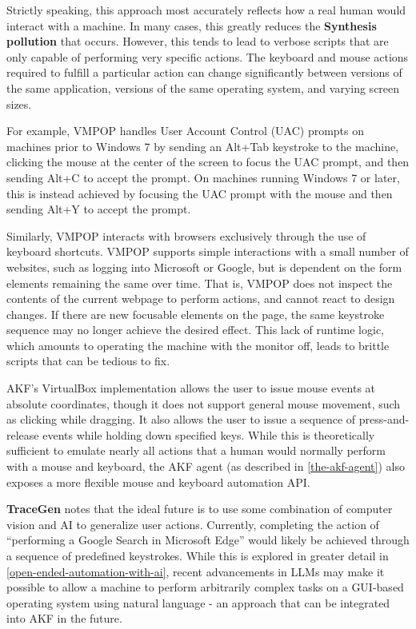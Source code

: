 \documentclass[letterpaper,12pt]{report}
\begin{document}
Strictly speaking, this approach most accurately reflects how a real
human would interact with a machine. In many cases, this greatly reduces
the \textbf{Synthesis pollution} that occurs. However, this tends to
lead to verbose scripts that are only capable of performing very
specific actions. The keyboard and mouse actions required to fulfill a
particular action can change significantly between versions of the same
application, versions of the same operating system, and varying screen
sizes.

For example, VMPOP handles User Account Control (UAC) prompts on
machines prior to Windows 7 by sending an Alt+Tab keystroke to the
machine, clicking the mouse at the center of the screen to focus the UAC
prompt, and then sending Alt+C to accept the prompt. On machines running
Windows 7 or later, this is instead achieved by focusing the UAC prompt
with the mouse and then sending Alt+Y to accept the prompt.

Similarly, VMPOP interacts with browsers exclusively through the use of
keyboard shortcuts. VMPOP supports simple interactions with a small
number of websites, such as logging into Microsoft or Google, but is
dependent on the form elements remaining the same over time. That is,
VMPOP does not inspect the contents of the current webpage to perform
actions, and cannot react to design changes. If there are new focusable
elements on the page, the same keystroke sequence may no longer achieve
the desired effect. This lack of runtime logic, which amounts to
operating the machine with the monitor off, leads to brittle scripts
that can be tedious to fix.

AKF's VirtualBox implementation allows the user to issue mouse events at
absolute coordinates, though it does not support general mouse movement,
such as clicking while dragging. It also allows the user to issue a
sequence of press-and-release events while holding down specified keys.
While this is theoretically sufficient to emulate nearly all actions
that a human would normally perform with a mouse and keyboard, the AKF
agent (as described in \autoref{the-akf-agent}) also exposes a more flexible mouse and keyboard automation API.

\textbf{TraceGen} notes that the ideal future is to use some combination
of computer vision and AI to generalize user actions. Currently,
completing the action of ``performing a Google Search in Microsoft
Edge'' would likely be achieved through a sequence of predefined
keystrokes. While this is explored in greater detail in \autoref{open-ended-automation-with-ai}, recent advancements
in LLMs may make it possible to allow a machine to perform arbitrarily
complex tasks on a GUI-based operating system using natural language -
an approach that can be integrated into AKF in the future.
\end{document}
